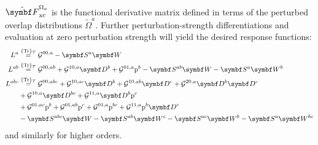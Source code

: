 $\pertmat{F}^{\Omega_a}_\mathrm{xc}$ is the functional derivative matrix
defined in terms of the perturbed overlap distributions
$\tilde{\Omega}^a$.
Further perturbation-strength differentiations and evaluation at zero
perturbation strength will yield the desired response functions:
\begin{subequations}
  \begin{align}
    L^a &\eqavetr
    \mathcal{G}^{00,a} - \mat{S}^a\mat{W} \label{eq:first-order} \\
    L^{ab} &\eqavetr \mathcal{G}^{00,ab}
    + \mathcal{G}^{10,a}\mat{D}^{b}
    + \mathcal{G}^{01,a}\p^{b}
    - \mat{S}^{ab}\mat{W}
    - \mat{S}^{a}\mat{W}^{b} \label{eq:second-order} \\
    L^{abc} &\eqavetr
      \mathcal{G}^{00,abc}
    + \mathcal{G}^{10,ac}\mat{D}^{b}
    + \mathcal{G}^{10,ab}\mat{D}^{c}
    + \mathcal{G}^{20,a}\mat{D}^{b}\mat{D}^{c} \nonumber \\
    &+ \mathcal{G}^{10,a}\mat{D}^{bc}
    + \mathcal{G}^{11,a}\mat{D}^{b}\p^c \label{eq:third-order} \\
    &+ \mathcal{G}^{01,ac}\p^{b}
    + \mathcal{G}^{01,ab}\p^{c}
    + \mathcal{G}^{01,a}\p^{bc}
    + \mathcal{G}^{11,a}\p^{b}\mat{D}^c \nonumber \\
    &- \mat{S}^{abc}\mat{W}
    - \mat{S}^{ab}\mat{W}^{c}
    - \mat{S}^{ac}\mat{W}^{b}
    - \mat{S}^{a}\mat{W}^{bc} \nonumber
  \end{align}
\end{subequations}
and similarly for higher orders.

